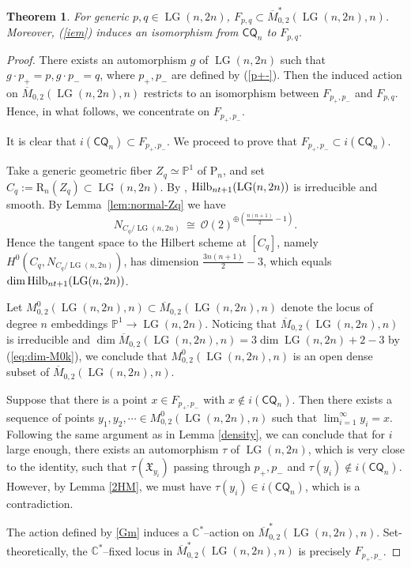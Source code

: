 \documentclass[10pt]{amsart}
\newtheorem{theorem}{Theorem}[section]
\theoremstyle{definition}
\newcommand{\C}{\mathbb{C}}
\newcommand{\Pbb}{\mathbb{P}}
\newcommand{\Mbar}{\overline{M}}
\newcommand{\LG}{\operatorname{LG}}
\newcommand{\CQ}{\mathsf{CQ}}
\newcommand{\RL}{\mathrm{R}}
\newcommand{\PL}{\mathrm{P}}
\theoremstyle{plain} %
\begin{document}
\begin{theorem}\label{thm:Fpq-is-CQ}
For generic $p,q\in \LG(n,2n)$, $F_{p,q}\subset\overline{M}_{0,2}^*(\LG(n,2n), n)$. Moreover, (\ref{iem}) induces an isomorphism from $\CQ_n$ to $F_{p,q}$.
\end{theorem}
\begin{proof}
There exists an automorphism $g$ of $\LG(n,2n)$ such that $g\cdot p_+=p,g\cdot p_-=q$, where $p_+,p_-$ are defined by (\ref{p+-}). Then the induced action on $\Mbar_{0,2}(\LG(n,2n),n)$ restricts to an isomorphism
between $F_{p_+,p_-}$ and $F_{p,q}$.
Hence, in what follows, we concentrate on $F_{p_{+},p_{-}}$. 



It is clear that $i(\CQ_n)\subset F_{p_{+},p_{-}}$. We proceed to prove that
$F_{p_{+},p_{-}}\subset i(\CQ_n)$. 

Take a generic geometric fiber $Z_q\simeq \Pbb^1$ of $\PL_n$, and set $C_q:=\RL_n(Z_q)\subset \LG(n,2n)$.
By \cite{Pe02}, ${\rm Hilb}_{nt+1}(\LG(n,2n))$ is irreducible and smooth.
By Lemma~\ref{lem:normal-Zq} we have
\[
N_{C_q/\LG(n,2n)} \ \cong\ \mathcal{O}(2)^{\oplus\left( \frac{n(n+1)}{2} - 1\right)}.
\]
Hence the tangent space to the Hilbert scheme at $[C_q]$, namely $H^0(C_q, N_{C_q/\LG(n,2n)})$, has dimension $\frac{3n(n+1)}{2} - 3$, which equals $\dim {\rm Hilb}_{nt+1}(\LG(n,2n))$.


Let $M^0_{0,2}(\LG(n,2n),n)\subset\Mbar_{0,2}(\LG(n,2n),n)$ denote the locus of  degree $n$ embeddings $\mathbb P^1\rightarrow \LG(n,2n)$.
Noticing that $\Mbar_{0,2}(\LG(n,2n),n)$ is irreducible and $\dim \Mbar_{0,2}(\LG(n,2n),n)=3\dim \LG(n,2n)  + 2 - 3$ by (\ref{eq:dim-M0k}), we conclude that $M^0_{0,2}(\LG(n,2n),n)$ is an open dense subset of $\Mbar_{0,2}(\LG(n,2n),n)$.



Suppose that there is a point  $x\in F_{p_{+},p_{-}}$ with $x\notin i(\CQ_n)$. Then there exists a sequence of points $y_1,y_2,\cdots\in M^0_{0,2}(\LG(n,2n),n)$ such that $\lim_{i=1}^{\infty}y_i=x$. Following the same argument as in Lemma \ref{density}, we can conclude that for $i$ large enough, there exists an automorphism $\tau$ of $\LG(n,2n)$, which is very close to the identity, such that $\tau(\mathfrak X_{y_i})$ passing through $p_+,p_-$ and $\tau(y_i)\notin i(\CQ_n)$. However, by Lemma \ref{2HM}, we must have $\tau(y_i)\in i(\CQ_n)$, which is a contradiction.

The action defined by \eqref{Gm} induces a $\C^*$--action on $\overline{M}_{0,2}^*(\LG(n,2n), n)$.
Set-theoretically, the $\C^*$--fixed locus in $\overline{M}_{0,2}^*(\LG(n,2n), n)$ is precisely $F_{p_{+},p_{-}}$.


\end{proof}
\end{document}
